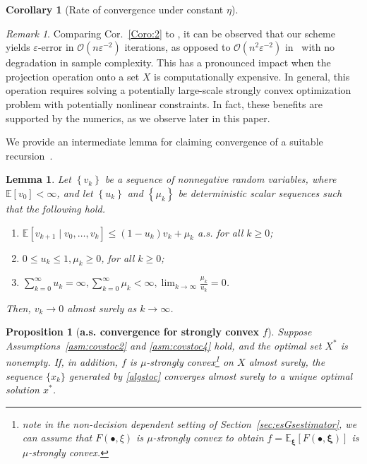 \documentclass[11pt,reqno]{amsart}
\newcommand{\1}{{\bf 1}}
\newcommand{\2}{{\bf 2}}
\newcommand{\mr}[1]{{\color{blue}#1}}
\newcommand{\bxi}{\boldsymbol{\xi}}
\newcommand{\E}{\mathbb E}
\numberwithin{equation}{section}
\newtheorem{lemma}{Lemma}[section]
\newtheorem{proposition}{Proposition}[section]
\newtheorem{corollary}{Corollary}[section]
\theoremstyle{remark}
\newtheorem{remark}{Remark}[section]
\begin{document}
{\begin{corollary}[Rate of convergence under constant $\eta$]
		\end{corollary}
		\begin{remark}
			{Comparing} Cor.~\ref{Coro:2} to \cite[Thm 6]{nesterov2017random}, it can be observed that our scheme yields $\varepsilon$-error in $\mathcal{O}(n\varepsilon^{-2})$ iterations, as opposed to $\mathcal{O}(n^2 \varepsilon^{-2})$ in~\cite{nesterov2017random} with no degradation in sample complexity. This has a pronounced impact when the projection operation onto a set $X$ is computationally expensive. In general, this operation requires solving a potentially large-scale strongly convex optimization problem with potentially nonlinear constraints. {In fact, these benefits are supported by the numerics, as we observe later in this paper. } 
		\end{remark}
		We provide an intermediate lemma for claiming convergence of a suitable recursion~\cite{polyak1987introduction}.
		\begin{lemma}\label{lemma:stronglycov} 
			Let \( \left\{v_{k}\right\} \) be a sequence of nonnegative random variables, where \( \mathbb{E}\left[v_{0}\right]<\infty \), and let \( \left\{u_{k}\right\} \) and \( \left\{\mu_{k}\right\} \) be deterministic scalar sequences such that the following hold.
			\begin{enumerate}[label=(\roman*)]
				\item \( \mathbb{E}\left[v_{k+1} \mid v_{0}, \ldots, v_{k}\right] \leq\left(1-u_{k}\right) v_{k}+\mu_{k} \) a.s. for all \( k \geq 0 \);
				\item \( 0 \leq u_{k} \leq 1,  \mu_{k} \geq 0 \), for all \( k \geq 0 \);
				\item \( \sum_{k=0}^{\infty} u_{k}=\infty,  \sum_{k=0}^{\infty} \mu_{k}<\infty,  \lim _{k \rightarrow \infty} \frac{\mu_{k}}{u_{k}}=0 \).
			\end{enumerate}
			Then, \( v_{k} \rightarrow 0 \) almost surely as \( k \rightarrow \infty \).
		\end{lemma}
		\begin{proposition}[{\bf a.s. convergence for strongly convex $f$}]\label{prop:Strongconvex}
			Suppose Assumptions~\ref{asm:covstoc2} and \ref{asm:covstoc4} hold, and the optimal set $X^*$ is nonempty. If, in addition, $f$ is $\mu$-strongly convex\footnote{note in the non-decision dependent setting of Section~\ref{sec:esGsestimator}, we can assume that $F(\bullet, \xi)$ is $\mu$-strongly convex to obtain $f = \E_{\bxi}[F(\bullet, \bxi)]$ is $\mu$-strongly convex.} on $X$ almost surely, the sequence $\{x_k\}$ generated by \eqref{algstoc} converges almost surely to a unique optimal solution $x^*$.

\end{proposition}}
\end{document}
